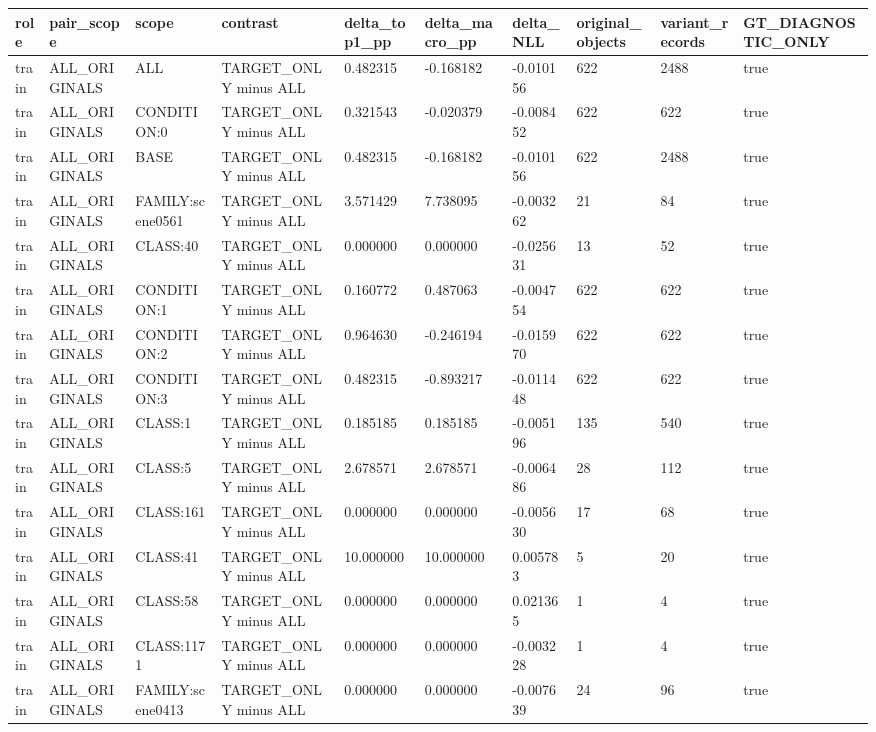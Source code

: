 \begin{tabular}{llllllllll}
\toprule
role & pair\_scope & scope & contrast & delta\_top1\_pp & delta\_macro\_pp & delta\_NLL & original\_objects & variant\_records & GT\_DIAGNOSTIC\_ONLY \\
\midrule
train & ALL\_ORIGINALS & ALL & TARGET\_ONLY minus ALL & 0.482315 & -0.168182 & -0.010156 & 622 & 2488 & true \\
train & ALL\_ORIGINALS & CONDITION:0 & TARGET\_ONLY minus ALL & 0.321543 & -0.020379 & -0.008452 & 622 & 622 & true \\
train & ALL\_ORIGINALS & BASE & TARGET\_ONLY minus ALL & 0.482315 & -0.168182 & -0.010156 & 622 & 2488 & true \\
train & ALL\_ORIGINALS & FAMILY:scene0561 & TARGET\_ONLY minus ALL & 3.571429 & 7.738095 & -0.003262 & 21 & 84 & true \\
train & ALL\_ORIGINALS & CLASS:40 & TARGET\_ONLY minus ALL & 0.000000 & 0.000000 & -0.025631 & 13 & 52 & true \\
train & ALL\_ORIGINALS & CONDITION:1 & TARGET\_ONLY minus ALL & 0.160772 & 0.487063 & -0.004754 & 622 & 622 & true \\
train & ALL\_ORIGINALS & CONDITION:2 & TARGET\_ONLY minus ALL & 0.964630 & -0.246194 & -0.015970 & 622 & 622 & true \\
train & ALL\_ORIGINALS & CONDITION:3 & TARGET\_ONLY minus ALL & 0.482315 & -0.893217 & -0.011448 & 622 & 622 & true \\
train & ALL\_ORIGINALS & CLASS:1 & TARGET\_ONLY minus ALL & 0.185185 & 0.185185 & -0.005196 & 135 & 540 & true \\
train & ALL\_ORIGINALS & CLASS:5 & TARGET\_ONLY minus ALL & 2.678571 & 2.678571 & -0.006486 & 28 & 112 & true \\
train & ALL\_ORIGINALS & CLASS:161 & TARGET\_ONLY minus ALL & 0.000000 & 0.000000 & -0.005630 & 17 & 68 & true \\
train & ALL\_ORIGINALS & CLASS:41 & TARGET\_ONLY minus ALL & 10.000000 & 10.000000 & 0.005783 & 5 & 20 & true \\
train & ALL\_ORIGINALS & CLASS:58 & TARGET\_ONLY minus ALL & 0.000000 & 0.000000 & 0.021365 & 1 & 4 & true \\
train & ALL\_ORIGINALS & CLASS:1171 & TARGET\_ONLY minus ALL & 0.000000 & 0.000000 & -0.003228 & 1 & 4 & true \\
train & ALL\_ORIGINALS & FAMILY:scene0413 & TARGET\_ONLY minus ALL & 0.000000 & 0.000000 & -0.007639 & 24 & 96 & true \\

\end{tabular}

